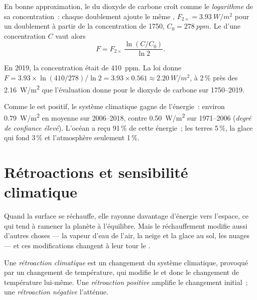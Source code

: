 \begin{proposition}\label{prop:g12:climate-change:log}
En bonne approximation, le  du dioxyde de carbone croît comme le
\emph{logarithme} de sa concentration~: chaque doublement ajoute le même
, $F_{2\times} = \qty{3.93}{W/m^2}$ pour un doublement à partir de
la concentration de 1750, $C_0 = \qty{278}{ppm}$. Le  d'une
concentration $C$ vaut alors
\[
  F = F_{2\times}\,\frac{\ln (C/C_0)}{\ln 2}.
\]
\end{proposition}

\begin{example}\label{ex:g12:climate-change:check}
En 2019, la concentration était de \qty{410}{ppm}. La loi donne
$F = 3.93 \times \ln(410/278)/\ln 2 = 3.93 \times 0.561 \approx
\qty{2.20}{W/m^2}$, à 2\,\% près des \qty{2.16}{W/m^2} que l'évaluation
donne pour le dioxyde de carbone sur 1750--2019.
\end{example}

\begin{proposition}\label{prop:g12:climate-change:heating}
Comme le  est positif, le système climatique gagne de l'énergie~:
environ \qty{0.79}{W/m^2} en moyenne sur 2006--2018, contre
\qty{0.50}{W/m^2} sur 1971--2006 (\emph{degré de confiance élevé}).
L'océan a reçu 91\,\% de cette énergie~; les terres 5\,\%, la glace qui
fond 3\,\% et l'atmosphère seulement 1\,\%.
\end{proposition}

\section{Rétroactions et sensibilité climatique}

Quand la surface se réchauffe, elle rayonne davantage d'énergie vers
l'espace, ce qui tend à ramener la planète à l'équilibre. Mais le
réchauffement modifie aussi d'autres choses --- la vapeur d'eau de l'air,
la neige et la glace au sol, les nuages --- et ces modifications changent à
leur tour le .

\begin{definition}\label{def:g12:climate-change:feedback}
Une \emph{rétroaction climatique}
est un changement du système climatique, provoqué par un changement de
température, qui modifie le  et donc le changement de
température lui-même. Une \emph{rétroaction positive} amplifie le
changement initial~; une \emph{rétroaction négative} l'atténue.
\end{definition}

